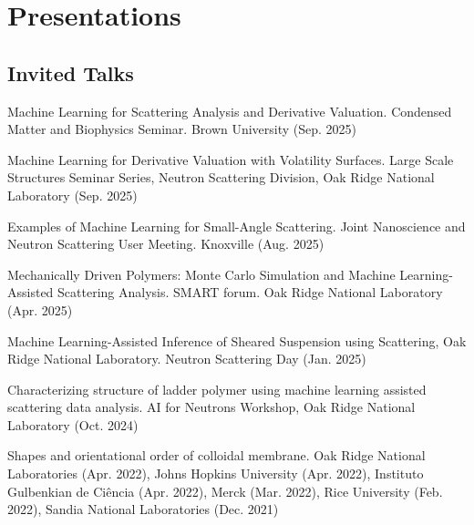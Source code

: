 \documentclass[11pt,letterpaper]{article}
\begin{document}
\section*{Presentations}

\subsection*{Invited Talks}
\begin{etaremune}
    \item Machine Learning for Scattering Analysis and Derivative Valuation. Condensed Matter and Biophysics Seminar. Brown University (Sep. 2025)
    \item Machine Learning for Derivative Valuation with Volatility Surfaces. Large Scale Structures Seminar Series, Neutron Scattering Division, Oak Ridge National Laboratory (Sep. 2025)
    \item Examples of Machine Learning for Small-Angle Scattering. Joint Nanoscience and Neutron Scattering User Meeting. Knoxville (Aug. 2025)
    \item Mechanically Driven Polymers: Monte Carlo Simulation and Machine Learning-Assisted Scattering Analysis. SMART forum. Oak Ridge National Laboratory (Apr. 2025)
    \item Machine Learning-Assisted Inference of Sheared Suspension using Scattering, Oak Ridge National Laboratory. Neutron Scattering Day (Jan. 2025)
    \item Characterizing structure of ladder polymer using machine learning assisted scattering data analysis. AI for Neutrons Workshop, Oak Ridge National Laboratory (Oct. 2024)
    \item Shapes and orientational order of colloidal membrane. Oak Ridge National Laboratories (Apr. 2022), Johns Hopkins University (Apr. 2022), Instituto Gulbenkian de Ciência (Apr. 2022), Merck (Mar. 2022), Rice University (Feb. 2022), Sandia National Laboratories (Dec. 2021)
\end{etaremune}
\end{document}
